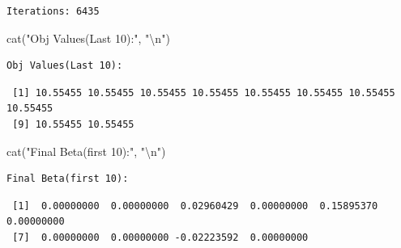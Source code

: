 \documentclass[
  letterpaper,
  DIV=11,
  numbers=noendperiod]{scrartcl}
\newenvironment{Shaded}{\begin{snugshade}}{\end{snugshade}}
\newcommand{\AttributeTok}[1]{\textcolor[rgb]{0.40,0.45,0.13}{#1}}
\newcommand{\DecValTok}[1]{\textcolor[rgb]{0.68,0.00,0.00}{#1}}
\newcommand{\FunctionTok}[1]{\textcolor[rgb]{0.28,0.35,0.67}{#1}}
\newcommand{\NormalTok}[1]{\textcolor[rgb]{0.00,0.23,0.31}{#1}}
\newcommand{\SpecialCharTok}[1]{\textcolor[rgb]{0.37,0.37,0.37}{#1}}
\newcommand{\StringTok}[1]{\textcolor[rgb]{0.13,0.47,0.30}{#1}}
\begin{document}
\begin{verbatim}
Iterations: 6435 
\end{verbatim}

\begin{Shaded}
\begin{Highlighting}[]
\FunctionTok{cat}\NormalTok{(}\StringTok{"Obj Values(Last 10):"}\NormalTok{, }\StringTok{"}\SpecialCharTok{\textbackslash{}n}\StringTok{"}\NormalTok{)}
\end{Highlighting}
\end{Shaded}

\begin{verbatim}
Obj Values(Last 10): 
\end{verbatim}

\begin{Shaded}
\end{Shaded}

\begin{verbatim}
 [1] 10.55455 10.55455 10.55455 10.55455 10.55455 10.55455 10.55455 10.55455
 [9] 10.55455 10.55455
\end{verbatim}

\begin{Shaded}
\begin{Highlighting}[]
\FunctionTok{cat}\NormalTok{(}\StringTok{"Final Beta(first 10):"}\NormalTok{, }\StringTok{"}\SpecialCharTok{\textbackslash{}n}\StringTok{"}\NormalTok{)}
\end{Highlighting}
\end{Shaded}

\begin{verbatim}
Final Beta(first 10): 
\end{verbatim}

\begin{Shaded}
\end{Shaded}

\begin{verbatim}
 [1]  0.00000000  0.00000000  0.02960429  0.00000000  0.15895370  0.00000000
 [7]  0.00000000  0.00000000 -0.02223592  0.00000000
\end{verbatim}
\end{document}
